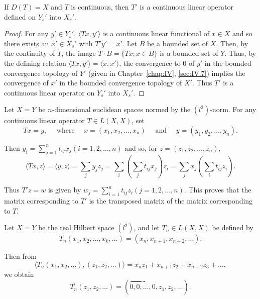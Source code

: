 \begin{theorem}\label{thm:VII.1.Theorem.2} If $D(T) = X$ and $T$ is continuous, then $T'$ is a continuous linear operator defined on $Y_s'$ into $X_s'$. 
\end{theorem}

\begin{proof}
 For any $y' \in Y_s'$, $\langle Tx, y' \rangle$ is a continuous linear functional of $x \in X$ and so there exists an $x' \in X_s'$ with $T'y' = x'$. Let $B$ be a bounded set of $X$. Then, by the continuity of $T$, the image $T \cdot B = \{Tx; x \in B\}$ is a bounded set of $Y$. Thus, by the defining relation $\langle Tx, y' \rangle = \langle x, x' \rangle$, the convergence to $0$ of $y'$ in the bounded convergence topology of $Y'$ (given in Chapter~\ref{chap:IV}, \ref{sec:IV.7}) implies the convergence of $x'$ in the bounded convergence topology of $X'$. Thus $T'$ is a continuous linear operator on $Y_s'$ into $X_s'$. 
\end{proof}

\begin{example}\label{ex:VII.1.Example.1} Let $X = Y$ be $n$-dimensional euclidean spaces normed by the $(l^2)$-norm. For any continuous linear operator $T \in L(X, X)$, set 
\[
T x = y, \quad \text{ where } \quad x = (x _{1}, x _{2}, \dots , x _{n}) \quad \text{ and } \quad y = (y _{1}, y _{2}, \dots , y _{n}).
\]
\end{example}

Then $y_{i} = \sum\limits_{j=1}^{n} t_{ij} x_{j} (i = 1, 2, \ldots, n)$ and so, for $z = (z_{1}, z_{2}, \ldots, z_{n})$, 
\[
\langle T x, z \rangle = \langle y, z \rangle = \sum\limits_{j} y _{j} z _{j} = \sum\limits_{i} \left(\sum\limits_{j} t _{ij} x _{j}\right) z _{i} = \sum\limits_{j} x _{j} \left(\sum\limits_{i} t _{ij} z _{i}\right).
\]

Thus $T'z = w$ is given by $w_{j} = \sum\limits_{i=1}^{n} t_{ij} z_{i} (j = 1, 2, \ldots, n)$. This proves that the matrix corresponding to $T'$ is the transposed matrix of the matrix corresponding to $T$. 

\begin{example}\label{ex:VII.1.Example.2} Let $X = Y$ be the real Hilbert space $(l^2)$, and let $T_n \in L(X, X)$ be defined by 
\[
T _{n} (x _{1}, x _{2}, \dots , x _{k}, \dots) = (x _{n}, x _{n+1}, x _{n+2}, \dots).
\]
\end{example}

Then from 
\[
\langle T _{n} (x _{1}, x _{2}, \dots), (z _{1}, z _{2}, \dots) \rangle = x _{n} z _{1} + x _{n+1} z _{2} + x _{n+2} z _{3} + \dots ,
\]
we obtain 
\[
T _{n} ^{\prime} (z _{1}, z _{2}, \dots) = (\overbrace {0 , 0 , \dots , 0}, z _{1}, z _{2}, \dots).
\]

